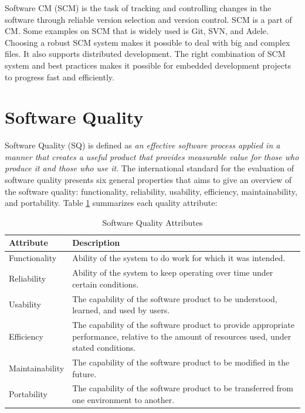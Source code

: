 Software CM (SCM) is the task of tracking and controlling changes in the software through reliable version selection and version control. SCM is a part of CM. Some examples on SCM that is widely used is Git, SVN, and Adele. Choosing a robust SCM system makes it possible to deal with big and complex files. It also supports distributed development. The right combination of SCM system and best practices makes it possible for embedded development projects to progress fast and efficiently. 






\section{Software Quality}
Software Quality (SQ) is defined as \textit{an effective software process applied in a manner that creates a useful product that provides measurable value for those who produce it and those who use it}\cite{Pressman:2009:SEP:1593949}. The international standard for the evaluation of software quality presents six general properties that aims to give an overview of the software quality: functionality, reliability, usability, efficiency, maintainability, and portability. Table \ref{tab:qattribute} summarizes each quality attribute:

\begin{table}[ht!]
	\centering
	\begin{tabular}{ | l | p{8cm} |}
	\hline
	\textbf{Attribute} & \textbf{Description} \\ \hline
	Functionality 		& Ability of the system to do work for which it was intended. \\ \hline
	Reliability 		& Ability of the system to keep operating over time under certain conditions. \\ \hline
	Usability 			& The capability of the software product to be understood, learned, and used by users. \\ \hline
	Efficiency 			& The capability of the software product to provide appropriate performance, relative to the amount of resources used, under stated conditions. \\ \hline
	Maintainability 	& The capability of the software product to be modified in the future.\\ \hline
	Portability 		& The capability of the software product to be transferred from one environment to another. \\ \hline
	\end{tabular}
	\caption{Software Quality Attributes} \label{tab:qattribute}
\end{table}



